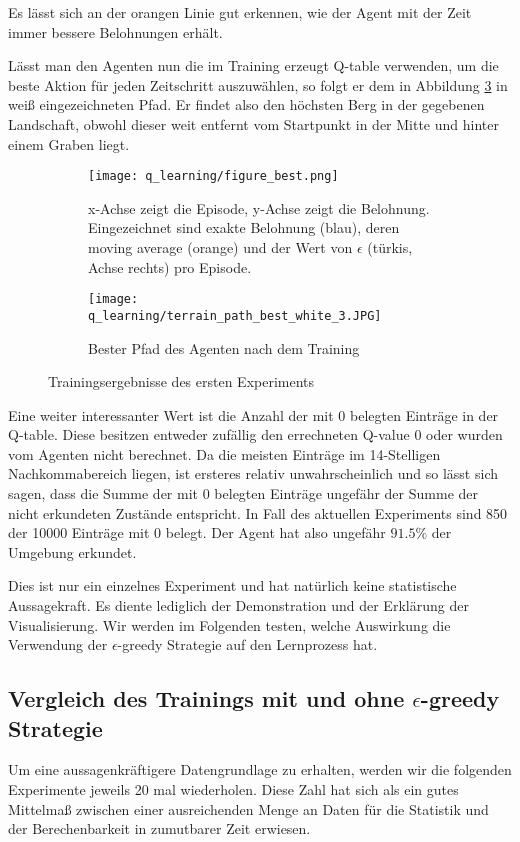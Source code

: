 Es lässt sich an der orangen Linie gut erkennen, wie der Agent mit der Zeit immer bessere Belohnungen erhält.

Lässt man den Agenten nun die im Training erzeugt Q-table verwenden, um die beste Aktion für jeden Zeitschritt auszuwählen, so folgt er dem in Abbildung \ref{img:pathQBest} in weiß eingezeichneten Pfad. Er findet also den höchsten Berg in der gegebenen Landschaft, obwohl dieser weit entfernt vom Startpunkt in der Mitte und hinter einem Graben liegt.

\begin{figure}[h!]
    \centering
    \begin{subfigure}[b]{0.49\textwidth}
        \texttt{[image: q\_learning/figure\_best.png]}
        \caption{x-Achse zeigt die Episode, y-Achse zeigt die Belohnung. Eingezeichnet sind exakte Belohnung (blau), deren moving average (orange) und der Wert von $ \epsilon $ (türkis, Achse rechts) pro Episode.}
        \label{img:graphQBest}
    \end{subfigure}
    \begin{subfigure}[b]{0.49\textwidth}
        \texttt{[image: q\_learning/terrain\_path\_best\_white\_3.JPG]}
        \caption{Bester Pfad des Agenten nach dem Training}
        \label{img:pathQBest}
    \end{subfigure}
    \caption{Trainingsergebnisse des ersten Experiments}
\end{figure}

Eine weiter interessanter Wert ist die Anzahl der mit 0 belegten Einträge in der Q-table. Diese besitzen entweder zufällig den errechneten Q-value 0 oder wurden vom Agenten nicht berechnet. Da die meisten Einträge im 14-Stelligen Nachkommabereich liegen, ist ersteres relativ unwahrscheinlich und so lässt sich sagen, dass die Summe der mit 0 belegten Einträge ungefähr der Summe der nicht erkundeten Zustände entspricht. In Fall des aktuellen Experiments sind 850 der 10000 Einträge mit 0 belegt. Der Agent hat also ungefähr $ 91.5\% $ der Umgebung erkundet.

Dies ist nur ein einzelnes Experiment und hat natürlich keine statistische Aussagekraft. Es diente lediglich der Demonstration und der Erklärung der Visualisierung. Wir werden im Folgenden testen, welche Auswirkung die Verwendung der $ \epsilon $-greedy Strategie auf den Lernprozess hat.

\subsection{Vergleich des Trainings mit und ohne $ \epsilon $-greedy Strategie}
Um eine aussagenkräftigere Datengrundlage zu erhalten, werden wir die folgenden Experimente jeweils 20 mal wiederholen. Diese Zahl hat sich als ein gutes Mittelmaß zwischen einer ausreichenden Menge an Daten für die Statistik und der Berechenbarkeit in zumutbarer Zeit erwiesen.

